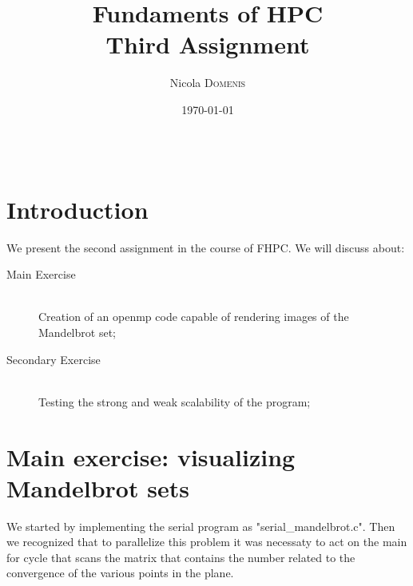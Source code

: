 \documentclass{article}
\title{Fundaments of HPC \\ Third Assignment} %
\author{Nicola \textsc{Domenis}} %
\date{\today} %
\begin{document}
\maketitle %

\begin{center}
\begin{tabular}{l r}

\end{tabular}
\end{center}



\section{Introduction}

We present the second assignment in the course of FHPC. We will discuss about:


\begin{description}
\item[Main Exercise] \hfill \\
Creation of an openmp code capable of rendering images of the Mandelbrot set;
\item[Secondary Exercise] \hfill \\
Testing the strong and weak scalability of the program;

\end{description} 
 

\section{Main exercise: visualizing Mandelbrot sets}

We started by implementing the serial program as "serial\_mandelbrot.c". 
Then we recognized that to parallelize this problem it was necessaty to act on the main for cycle that scans the matrix that contains the number related to the convergence of the various points in the plane.
\end{document}
